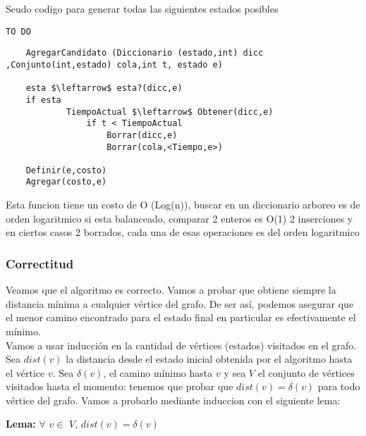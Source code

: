 Seudo codigo para generar todas las siguientes estados posibles
\lstset{basicstyle=\large}

\begin{lstlisting}
TO DO
\end{lstlisting}

\lstset{basicstyle=\large}
\begin{lstlisting}
	AgregarCandidato (Diccionario (estado,int) dicc ,Conjunto(int,estado) cola,int t, estado e)

	esta $\leftarrow$ esta?(dicc,e)
	if esta
			TiempoActual $\leftarrow$ Obtener(dicc,e)
				if t < TiempoActual
					Borrar(dicc,e)
					Borrar(cola,<Tiempo,e>)

	Definir(e,costo)
	Agregar(costo,e)

\end{lstlisting}

Esta funcion tiene un costo de O (Log(n)), buscar en un diccionario arboreo es de orden logaritmico si esta balanceado, comparar 2 enteros es O(1) 2 inserciones
y en ciertos casos 2 borrados, cada una de esas operaciones es del orden logaritmico


	\subsubsection{Correctitud}

Veamos que el algoritmo es correcto. Vamos a probar que obtiene siempre la distancia mínima a cualquier vértice del grafo. De ser así, podemos asegurar que el menor camino encontrado para el estado final en particular es efectivamente el mínimo.
\\

Vamos a usar inducción en la cantidad de vértices (estados) visitados en el grafo.
Sea $dist(v)$ la distancia desde el estado inicial obtenida por el algoritmo hasta el vértice $v$. Sea $\delta(v)$, el camino mínimo hasta $v$ y sea $V$ el conjunto de vértices visitados hasta el momento: tenemos que probar que $dist(v) = \delta(v)$ para todo vértice del grafo. Vamos a probarlo mediante induccion con el siguiente lema:
\\


\begin{center}
\textbf{Lema: } $\forall$ $v \in$ $V$, $dist(v) = \delta(v)$
\end{center}

